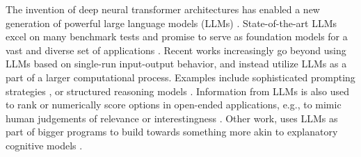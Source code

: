 \documentclass[fleqn]{article}
\begin{document}
The invention of deep neural transformer architectures \citep{VaswaniShazeer2017:Attention-is-Al} has enabled a new generation of powerful large language models (LLMs) \citep{DevlinChang2019:BERT:-Pre-train,ChungHou2022:Scaling-Instruc,OpenAI2023:GPT-4-Technical,TouvronLavril2023:LLaMA:-Open-and}.
State-of-the-art LLMs excel on many benchmark tests  and promise to serve as foundation models for a vast and diverse set of applications \citep{BommasaniHudson2021:On-the-opportun}.
Recent works increasingly go beyond using LLMs based on single-run input-output behavior, and instead utilize LLMs as a part of a larger computational process.
Examples include sophisticated prompting strategies \citep[e.g.,][]{LiuLiu2022:Generated-Knowl}, or structured reasoning models \citep[e.g.,][]{CreswellShanahan2022:Selection-Infer,GaoMadaan2023:PAL:-Program-ai,ParanjapeLundberg2023:ART:-Automatic-}.
Information from LLMs is also used  to rank or numerically score options in open-ended applications, e.g., to mimic human judgements of relevance or interestingness \citep[e.g.,][]{ParkOBrien2023:Generative-Agen,ZhangLehman2023:OMNI:-Open-ende}.
Other work, uses LLMs as part of bigger programs to build towards something more akin to explanatory cognitive models \citep[e.g.,][]{WongGrand2023:From-Word-Model}.
\end{document}
